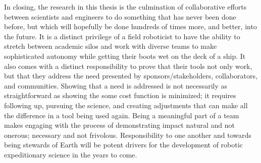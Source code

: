 In closing, the research in this thesis is the culmination of collaborative efforts between scientists and engineers to do something that has never been done before, but which will hopefully be done hundreds of times more, and better, into the future. It is a distinct privilege of a field roboticist to have the ability to stretch between academic silos and work with diverse teams to make sophisticated autonomy while getting their boots wet on the deck of a ship. It also comes with a distinct responsibility to prove that their tools not only work, but that they address the need presented by sponsors/stakeholders, collaborators, and communities. Showing that a need is addressed is not necessarily as straightforward as showing the some cost function is minimized; it requires following up, pursuing the science, and creating adjustments that can make all the difference in a tool being used again. Being a meaningful part of a team makes engaging with the process of demonstrating impact natural and not onerous; necessary and not frivolous. Responsibility to one another and towards being stewards of Earth will be potent drivers for the development of robotic expeditionary science in the years to come.


